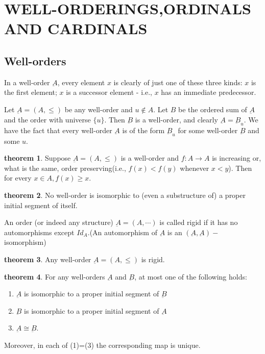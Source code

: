 \documentclass[a4paper,11pt]{article}%
\theoremstyle{remark}
\theoremstyle{definition}
\newtheorem{theorem}{theorem}[section]
\theoremstyle{definition}
\theoremstyle{plain}
\theoremstyle{definition}
\begin{document}
\section{WELL-ORDERINGS,ORDINALS AND CARDINALS}
\subsection{Well-orders}
In a well-order $\underbar{A}$, every element $x$ is clearly of just one of 
these three kinds: $x$ is the first element; $x$ is a successor element - i.e., $x$
has an immediate predecessor. 

Let $\underbar{A}=(A,\leq)$ be any well-order and $u\notin A$.
Let $B$ be the ordered sum of $\underbar{A}$ and the order with universe $\{u\}$.
Then $\underbar{B}$ is a well-order, and clearly $\underbar{A}=\underbar{B}_u$.
We have the fact that every well-order $\underbar{A}$ is of the form $\underbar{B}_u$
for some well-order $\underbar{B}$ and some $u$.
\begin{theorem}
    Suppose $\underbar{A}=(A,\leq)$ is a well-order and $f:A\rightarrow A$ is
    increasing or, what is the same, order preserving(i.e., $f(x)<f(y)$ whenever $x<y$).
    Then for every $x\in A,f(x)\geq x$.
\end{theorem}
\begin{theorem}
    No well-order is isomorphic to (even a substructure of) a proper initial segment of itself.
\end{theorem}
An order (or indeed any structure) $\underbar{A}=(A,\cdots)$ is called rigid
if it has no automorphisms except $Id_A$.(An automorphism of $\underbar{A}$ is an 
$(\underbar{A},\underbar{A})-$isomorphism)
\begin{theorem}
    Any well-order $\underbar{A}=(A,\leq)$ is rigid.
\end{theorem}
\begin{theorem}
    For any well-orders $\underbar{A}$ and $\underbar{B}$, at most 
    one of the following holds:
    \begin{enumerate}
        \item $\underbar{A}$ is isomorphic to a proper initial segment of $\underbar{B}$
        \item $\underbar{B}$ is isomorphic to a proper initial segment of $\underbar{A}$
        \item $\underbar{A}\cong\underbar{B}$.
    \end{enumerate}
    Moreover, in each of (1)=(3) the corresponding map is unique.
\end{theorem}
\end{document}
